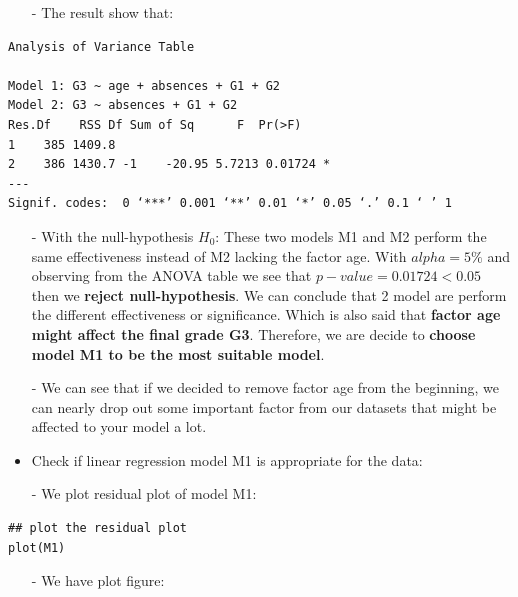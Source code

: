\documentclass[a4paper]{article}
\numberwithin{equation}{section}
\begin{document}
\begin{itemize}
  \item [-] The result show that:
\end{itemize}
\begin{mdframed}[leftline=false,rightline=false,backgroundcolor=teal!10,nobreak=true]
  \begin{verbatim}
Analysis of Variance Table

Model 1: G3 ~ age + absences + G1 + G2
Model 2: G3 ~ absences + G1 + G2
Res.Df    RSS Df Sum of Sq      F  Pr(>F)
1    385 1409.8
2    386 1430.7 -1    -20.95 5.7213 0.01724 *
---
Signif. codes:  0 ‘***’ 0.001 ‘**’ 0.01 ‘*’ 0.05 ‘.’ 0.1 ‘ ’ 1
  \end{verbatim}
\end{mdframed}
\begin{itemize}
  \item[-] With the null-hypothesis \(H_0\): These two models M1 and M2 perform the same effectiveness instead of M2 lacking the factor age. With \(alpha = 5\%\) and observing from the ANOVA table we see that \(p-value = 0.01724 < 0.05\) then we \textbf{reject null-hypothesis}. We can conclude that 2 model are perform the different effectiveness or significance. Which is also said that \textbf{factor age might affect the final grade G3}. Therefore, we are decide to \textbf{choose model M1 to be the most suitable model}.
  \item[-] We can see that if we decided to remove factor age from the beginning, we can nearly drop out some important factor from our datasets that might be affected to your model a lot.
\end{itemize}

\begin{itemize}
  \item Check if linear regression model M1 is appropriate for the data:
\end{itemize}

\begin{itemize}
  \item[-] We plot residual plot of model M1:
\end{itemize}

\begin{mdframed}[leftline=false,rightline=false,backgroundcolor=magenta!10,nobreak=true]
  \begin{verbatim}
## plot the residual plot
plot(M1)
  \end{verbatim}
\end{mdframed}
\begin{itemize}
  \item[-] We have plot figure:
\end{itemize}
\end{document}
